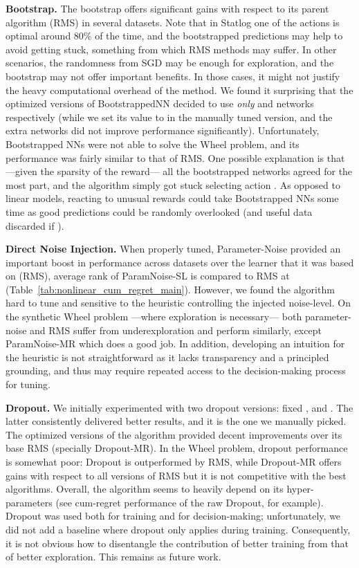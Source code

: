 \documentclass{article} \usepackage{iclr2018_conference,times}
\begin{document}
\textbf{Bootstrap.}
The bootstrap offers significant gains with respect to its parent algorithm (RMS) in several datasets.
Note that in Statlog one of the actions is optimal around 80\% of the time, and the bootstrapped predictions may help to avoid getting stuck, something from which RMS methods may suffer.
In other scenarios, the randomness from SGD may be enough for exploration, and the bootstrap may not offer important benefits.
In those cases, it might not justify the heavy computational overhead of the method.
We found it surprising that the optimized versions of BootstrappedNN decided to use \emph{only}  and  networks respectively (while we set its value to  in the manually tuned version, and the extra networks did not improve performance significantly).
Unfortunately, Bootstrapped NNs were not able to solve the Wheel problem, and its performance was fairly similar to that of RMS.
One possible explanation is that ---given the sparsity of the reward--- all the bootstrapped networks agreed for the most part, and the algorithm simply got stuck selecting action . As opposed to linear models, reacting to unusual rewards could take Bootstrapped NNs some time as good predictions could be randomly overlooked (and useful data discarded if ).

\textbf{Direct Noise Injection.} When properly tuned, Parameter-Noise provided an important boost in performance across datasets over the learner that it was based on (RMS), average rank of ParamNoise-SL is  compared to RMS at  (Table~\ref{tab:nonlinear_cum_regret_main}). However, we found the algorithm hard to tune and sensitive to the heuristic controlling the injected noise-level. On the synthetic Wheel problem ---where exploration is necessary--- both parameter-noise and RMS suffer from underexploration and perform similarly, except ParamNoise-MR which does a good job. In addition, developing an intuition for the heuristic is not straightforward as it lacks transparency and a principled grounding, and thus may require repeated access to the decision-making process for tuning.

\textbf{Dropout.} We initially experimented with two dropout versions: fixed , and . The latter consistently delivered better results, and it is the one we manually picked.
The optimized versions of the algorithm provided decent improvements over its base RMS (specially Dropout-MR).
In the Wheel problem, dropout performance is somewhat poor: Dropout is outperformed by RMS, while Dropout-MR offers gains with respect to all versions of RMS but it is not competitive with the best algorithms.
Overall, the algorithm seems to heavily depend on its hyper-parameters (see cum-regret performance of the raw Dropout, for example).
Dropout was used both for training and for decision-making; unfortunately, we did not add a baseline where dropout only applies during training. Consequently, it is not obvious how to disentangle the contribution of better training from that of better exploration. This remains as future work.
\end{document}
